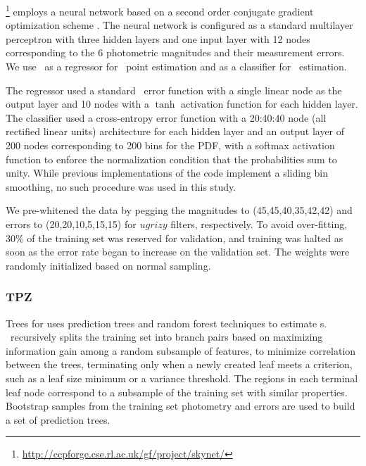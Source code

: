\skynet \footnote{\url{http://ccpforge.cse.rl.ac.uk/gf/project/skynet/}} \citep{Graff:14} employs a neural network based on a second order conjugate gradient optimization scheme \citep[see][for further details]{Graff:14}. %
The neural network is configured as a standard multilayer perceptron with three hidden layers and one input layer with 12 nodes corresponding to the 6 photometric magnitudes and their measurement errors.
We use \skynet\ as a regressor for \pz\ point estimation and as a classifier for \pzpdf\ estimation.

The regressor used a standard \chisq\ error function with a single linear node as the output layer and 10 nodes with a $\tanh$ activation function for each hidden layer.
The classifier used a cross-entropy error function with a 20:40:40 node (all rectified linear units) architecture for each hidden layer and an output layer of 200 nodes corresponding to 200 bins for the PDF, with a softmax activation function to enforce the normalization condition that the probabilities sum to unity.
While previous implementations of the code \citep[see Appendix C.3 of~][]{Sanchez:14,Bonnett:15} implement a sliding bin smoothing, no such procedure was used in this study.

We pre-whitened the data by pegging the magnitudes to (45,45,40,35,42,42) and errors to (20,20,10,5,15,15) for $ugrizy$ filters, respectively.
To avoid over-fitting, $30\%$ of the training set was reserved for validation, and training was halted as soon as the error rate began to increase on the validation set.
The weights were randomly initialized based on normal sampling.

\subsubsection{TPZ}

Trees for \Pz \citep[\tpz\footnote{\url{https://github.com/mgckind/MLZ}},][]{Carrasco_Kind:13,Carrascokind:14} uses prediction trees and random forest techniques to estimate \pzpdf s.
\tpz\ recursively splits the training set into branch pairs based on maximizing information gain among a random subsample of features, to minimize correlation between the trees, terminating only when a newly created leaf meets a criterion, such as a leaf size minimum or a variance threshold.
The regions in each terminal leaf node correspond to a subsample of the training set with similar properties.
Bootstrap samples from the training set photometry and errors are used to build a set of prediction trees.

